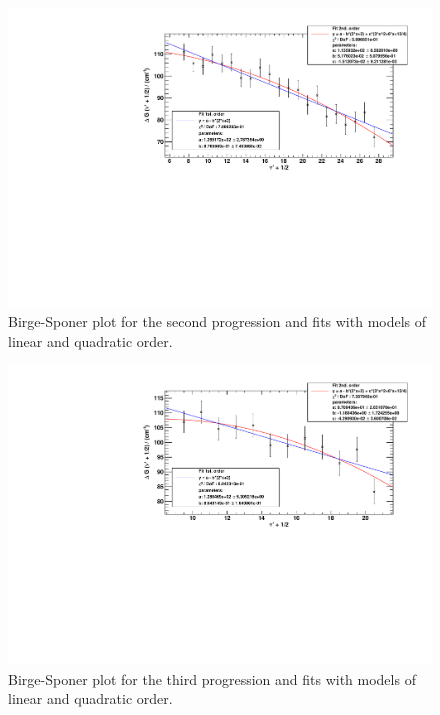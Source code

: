 \begin{figure}[H]
\begin{center}
  \includegraphics[width=\textwidth]{../img/prog2_birgesponer.pdf}
  \caption[---]{Birge-Sponer plot for the second progression and fits with models of linear and quadratic order.}
  \label{img:prog2}
\end{center}
\end{figure}


\begin{figure}[H]
\begin{center}
  \includegraphics[width=\textwidth]{../img/prog3_birgesponer.pdf}
  \caption[---]{Birge-Sponer plot for the third progression and fits with models of linear and quadratic order.}
  \label{img:prog3}
\end{center}
\end{figure}



